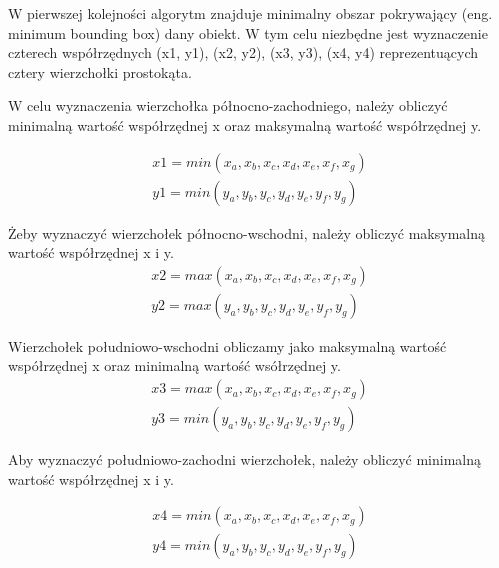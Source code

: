 W pierwszej kolejności algorytm znajduje minimalny obszar pokrywający (eng. minimum bounding box) dany obiekt. W tym celu niezbędne jest wyznaczenie czterech współrzędnych (x1, y1), (x2, y2), (x3, y3), (x4, y4) reprezentuących cztery wierzchołki prostokąta.

W celu wyznaczenia wierzchołka północno-zachodniego, należy obliczyć minimalną wartość współrzędnej x oraz maksymalną wartość współrzędnej y. 

\begin{equation} \label{sec:drugiWierzcholek}
\begin{split}
x1 = min(x_a, x_b, x_c, x_d, x_e, x_f, x_g) \\
y1 = min(y_a, y_b, y_c, y_d, y_e, y_f, y_g)
\end{split}
\end{equation}\newline

Żeby wyznaczyć wierzchołek północno-wschodni, należy obliczyć maksymalną wartość współrzędnej x i y. 
\begin{equation} \label{sec:trzeciWierzcholek}
\begin{split}
x2 = max(x_a, x_b, x_c, x_d, x_e, x_f, x_g)  \\
y2 = max(y_a, y_b, y_c, y_d, y_e, y_f, y_g)
\end{split}
\end{equation}\newline

Wierzchołek południowo-wschodni obliczamy jako maksymalną wartość współrzędnej x oraz minimalną wartość wsółrzędnej y. 
\begin{equation} \label{sec:czwartyWierzcholek}
\begin{split}
x3 = max(x_a, x_b, x_c, x_d, x_e, x_f, x_g) \\
y3 = min(y_a, y_b, y_c, y_d, y_e, y_f, y_g)
\end{split}
\end{equation}\newline

Aby wyznaczyć południowo-zachodni wierzchołek, należy obliczyć minimalną wartość współrzędnej x i y.

\begin{equation} \label{sec:pierwszyWierzcholek}
\begin{split}
x4 = min(x_a, x_b, x_c, x_d, x_e, x_f, x_g) \\
y4 = min(y_a, y_b, y_c, y_d, y_e, y_f, y_g)
\end{split}
\end{equation}\newline

